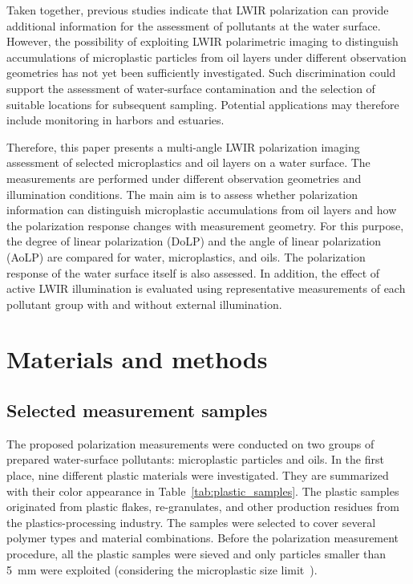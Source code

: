 \documentclass[pdflatex,sn-apa]{sn-jnl}
\begin{document}
Taken together, previous studies indicate that LWIR polarization can provide additional information for the assessment of pollutants at the water surface. However, the possibility of exploiting LWIR polarimetric imaging to distinguish accumulations of microplastic particles from oil layers under different observation geometries has not yet been sufficiently investigated. Such discrimination could support the assessment of water-surface contamination and the selection of suitable locations for subsequent sampling. Potential applications may therefore include monitoring in harbors and estuaries.

Therefore, this paper presents a multi-angle LWIR polarization imaging assessment of selected microplastics and oil layers on a water surface. The measurements are performed under different observation geometries and illumination conditions. The main aim is to assess whether polarization information can distinguish microplastic accumulations from oil layers and how the polarization response changes with measurement geometry. For this purpose, the degree of linear polarization (DoLP) and the angle of linear polarization (AoLP) are compared for water, microplastics, and oils. The polarization response of the water surface itself is also assessed. In addition, the effect of active LWIR illumination is evaluated using representative measurements of each pollutant group with and without external illumination.

\section{Materials and methods}

\subsection{Selected measurement samples}

The proposed polarization measurements were conducted on two groups of prepared water-surface pollutants: microplastic particles and oils. In the first place, nine different plastic materials were investigated. They are summarized with their color appearance in Table~\ref{tab:plastic_samples}. The plastic samples originated from plastic flakes, re-granulates, and other production residues from the plastics-processing industry. The samples were selected to cover several polymer types and material combinations. Before the polarization measurement procedure, all the plastic samples were sieved and only particles smaller than 5~mm were exploited (considering the microplastic size limit~\citep{Hartmann2019,Nihei2024}). 
\end{document}
